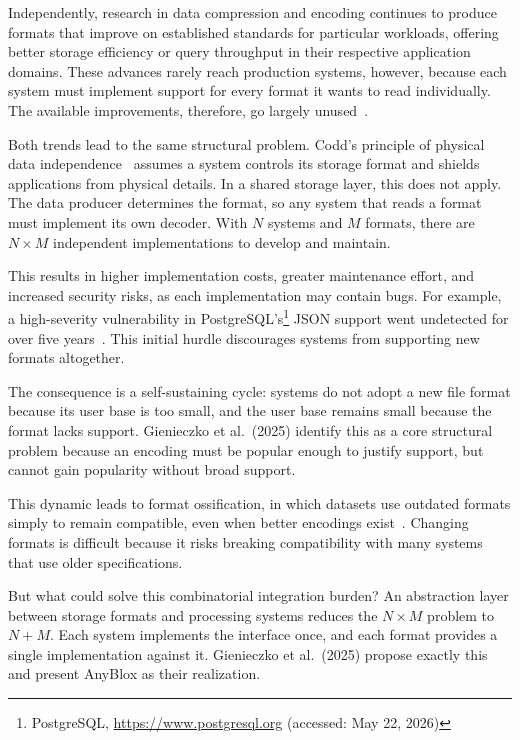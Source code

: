 Independently, research in data compression and encoding continues to produce formats that improve on established standards for particular workloads, offering better storage efficiency or query throughput in their respective application domains. These advances rarely reach production systems, however, because each system must implement support for every format it wants to read individually. The available improvements, therefore, go largely unused~\cite{gienieczkoAnyBloxFrameworkSelfDecoding2025}.

Both trends lead to the same structural problem. Codd's principle of physical data independence~\cite{coddRelationalModelData1970} assumes a system controls its storage format and shields applications from physical details. In a shared storage layer, this does not apply. The data producer determines the format, so any system that reads a format must implement its own decoder. With $N$ systems and $M$ formats, there are $N \times M$ independent implementations to develop and maintain.

This results in higher implementation costs, greater maintenance effort, and increased security risks, as each implementation may contain bugs. For example, a high-severity vulnerability in PostgreSQL's\footnote {PostgreSQL, \url{https://www.postgresql.org} (accessed: May 22, 2026)} JSON support went undetected for over five years~\cite{NVDCVE201715098}. This initial hurdle discourages systems from supporting new formats altogether.

The consequence is a self-sustaining cycle: systems do not adopt a new file format because its user base is too small, and the user base remains small because the format lacks support. Gienieczko et al.\ (2025) identify this as a core structural problem because an encoding must be popular enough to justify support, but cannot gain popularity without broad support.

This dynamic leads to format ossification, in which datasets use outdated formats simply to remain compatible, even when better encodings exist~\cite{kuiperQueryEnginesGatekeepers2025}. Changing formats is difficult because it risks breaking compatibility with many systems that use older specifications.

But what could solve this combinatorial integration burden? An abstraction layer between storage formats and processing systems reduces the $N \times M$ problem to $N + M$. Each system implements the interface once, and each format provides a single implementation against it. Gienieczko et al.\ (2025) propose exactly this and present AnyBlox as their realization.